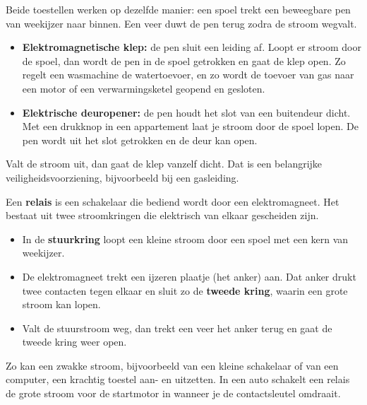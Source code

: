\documentclass{ximera}
\begin{document}
\begin{example}[foldable=true,title={Elektromagnetische klep en elektrische deuropener}]\nl
    Beide toestellen werken op dezelfde manier: een spoel trekt een beweegbare pen van weekijzer naar binnen. Een veer duwt de pen terug zodra de stroom wegvalt.
    \begin{itemize}
        \item \textbf{Elektromagnetische klep:} de pen sluit een leiding af. Loopt er stroom door de spoel, dan wordt de pen in de spoel getrokken en gaat de klep open. Zo regelt een wasmachine de watertoevoer, en zo wordt de toevoer van gas naar een motor of een verwarmingsketel geopend en gesloten.
        \item \textbf{Elektrische deuropener:} de pen houdt het slot van een buitendeur dicht. Met een drukknop in een appartement laat je stroom door de spoel lopen. De pen wordt uit het slot getrokken en de deur kan open.
    \end{itemize}
    Valt de stroom uit, dan gaat de klep vanzelf dicht. Dat is een belangrijke veiligheidsvoorziening, bijvoorbeeld bij een gasleiding.
\end{example}

\begin{example}[foldable=true,title={Relais}]\nl
    Een \textbf{relais} is een schakelaar die bediend wordt door een elektromagneet. Het bestaat uit twee stroomkringen die elektrisch van elkaar gescheiden zijn.
    \begin{itemize}
        \item In de \textbf{stuurkring} loopt een kleine stroom door een spoel met een kern van weekijzer.
        \item De elektromagneet trekt een ijzeren plaatje (het anker) aan. Dat anker drukt twee contacten tegen elkaar en sluit zo de \textbf{tweede kring}, waarin een grote stroom kan lopen.
        \item Valt de stuurstroom weg, dan trekt een veer het anker terug en gaat de tweede kring weer open.
    \end{itemize}
    Zo kan een zwakke stroom, bijvoorbeeld van een kleine schakelaar of van een computer, een krachtig toestel aan- en uitzetten. In een auto schakelt een relais de grote stroom voor de startmotor in wanneer je de contactsleutel omdraait.
\end{example}
\end{document}

